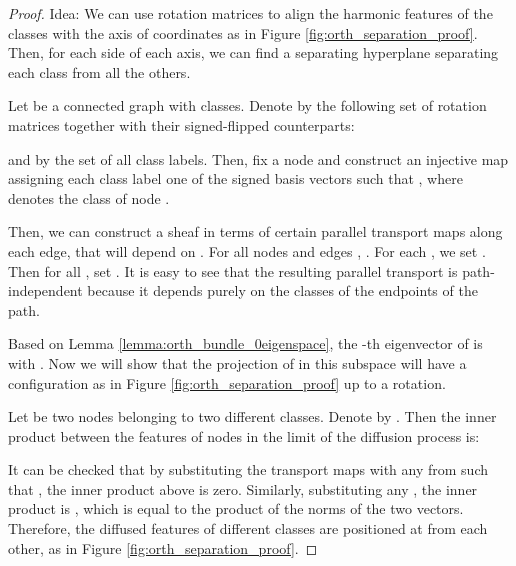 \documentclass{article}
\begin{document}
\begin{proof} Idea: We can use rotation matrices to align the harmonic features of the classes with the axis of coordinates as in Figure \ref{fig:orth_separation_proof}. Then, for each side of each axis, we can find a separating hyperplane separating each class from all the others. 

Let  be a connected graph with  classes. Denote by  the following set of rotation matrices together with their signed-flipped counterparts:

and by  the set of all class labels. Then, fix a node  and construct an injective map  assigning each class label one of the signed basis vectors such that , where  denotes the class of node . 
 
Then, we can construct a sheaf  in terms of certain parallel transport maps along each edge, that will depend on . For all nodes  and edges , . For each , we set . Then for all , set . It is easy to see that the resulting parallel transport is path-independent because it depends purely on the classes of the endpoints of the path. 

Based on Lemma \ref{lemma:orth_bundle_0eigenspace}, the -th eigenvector of  is  with . Now we will show that the projection of  in this subspace will have a configuration as in Figure \ref{fig:orth_separation_proof} up to a rotation.

Let  be two nodes belonging to two different classes. Denote by . Then the inner product between the features of nodes  in the limit of the diffusion process is: 

It can be checked that by substituting the transport maps  with any  from  such that , the inner product above is zero. Similarly, substituting any , the inner product is , which is equal to the product of the norms of the two vectors. Therefore, the diffused features of different classes are positioned at  from each other, as in Figure \ref{fig:orth_separation_proof}. 
\end{proof}
\end{document}

